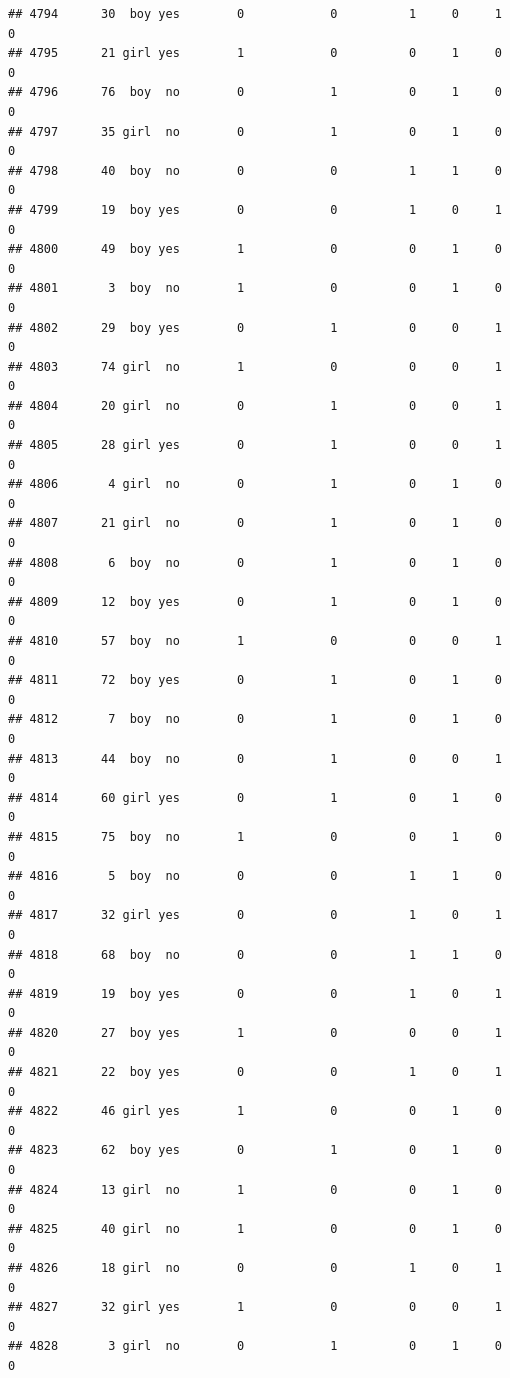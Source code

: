 \documentclass[man]{apa6}
\begin{document}
\begin{verbatim}
## 4794      30  boy yes        0            0          1     0     1     0
## 4795      21 girl yes        1            0          0     1     0     0
## 4796      76  boy  no        0            1          0     1     0     0
## 4797      35 girl  no        0            1          0     1     0     0
## 4798      40  boy  no        0            0          1     1     0     0
## 4799      19  boy yes        0            0          1     0     1     0
## 4800      49  boy yes        1            0          0     1     0     0
## 4801       3  boy  no        1            0          0     1     0     0
## 4802      29  boy yes        0            1          0     0     1     0
## 4803      74 girl  no        1            0          0     0     1     0
## 4804      20 girl  no        0            1          0     0     1     0
## 4805      28 girl yes        0            1          0     0     1     0
## 4806       4 girl  no        0            1          0     1     0     0
## 4807      21 girl  no        0            1          0     1     0     0
## 4808       6  boy  no        0            1          0     1     0     0
## 4809      12  boy yes        0            1          0     1     0     0
## 4810      57  boy  no        1            0          0     0     1     0
## 4811      72  boy yes        0            1          0     1     0     0
## 4812       7  boy  no        0            1          0     1     0     0
## 4813      44  boy  no        0            1          0     0     1     0
## 4814      60 girl yes        0            1          0     1     0     0
## 4815      75  boy  no        1            0          0     1     0     0
## 4816       5  boy  no        0            0          1     1     0     0
## 4817      32 girl yes        0            0          1     0     1     0
## 4818      68  boy  no        0            0          1     1     0     0
## 4819      19  boy yes        0            0          1     0     1     0
## 4820      27  boy yes        1            0          0     0     1     0
## 4821      22  boy yes        0            0          1     0     1     0
## 4822      46 girl yes        1            0          0     1     0     0
## 4823      62  boy yes        0            1          0     1     0     0
## 4824      13 girl  no        1            0          0     1     0     0
## 4825      40 girl  no        1            0          0     1     0     0
## 4826      18 girl  no        0            0          1     0     1     0
## 4827      32 girl yes        1            0          0     0     1     0
## 4828       3 girl  no        0            1          0     1     0     0

\end{verbatim}
\end{document}
